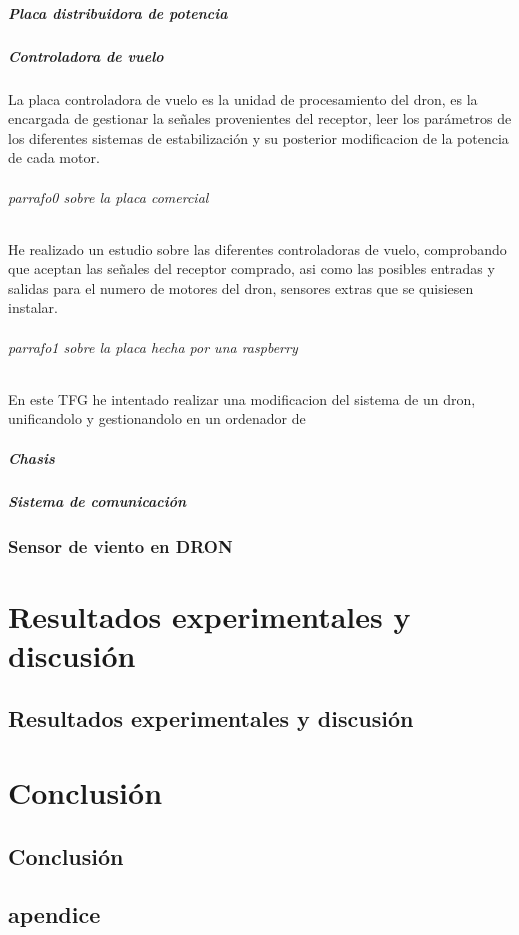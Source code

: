 \documentclass[spanish]{book}
\begin{document}
                \subsubsection{Placa distribuidora de potencia}
                \subsubsection{Controladora de vuelo}
                La placa controladora de vuelo es la unidad de procesamiento del dron, es la encargada de gestionar la señales provenientes del receptor, leer los parámetros de los diferentes sistemas de estabilización y su posterior modificacion de la potencia de cada motor.
                \paragraph{parrafo0 sobre la placa comercial}
                He realizado un estudio sobre las diferentes controladoras de vuelo, comprobando que aceptan las señales del receptor comprado, asi como las posibles entradas y salidas para el numero de motores del dron, sensores extras que se quisiesen instalar.
                \paragraph{parrafo1 sobre la placa hecha por una raspberry}
                En este TFG he intentado realizar una modificacion del sistema de un dron, unificandolo y gestionandolo en un ordenador de 
                \subsubsection{Chasis}
                \subsubsection{Sistema de comunicación}
        
        \section{Sensor de viento en DRON}

\part{Resultados experimentales y discusión}
    \chapter{Resultados experimentales y discusión}

\part{Conclusión}
    \chapter{Conclusión}

\appendix

\chapter{apendice}
\end{document}
